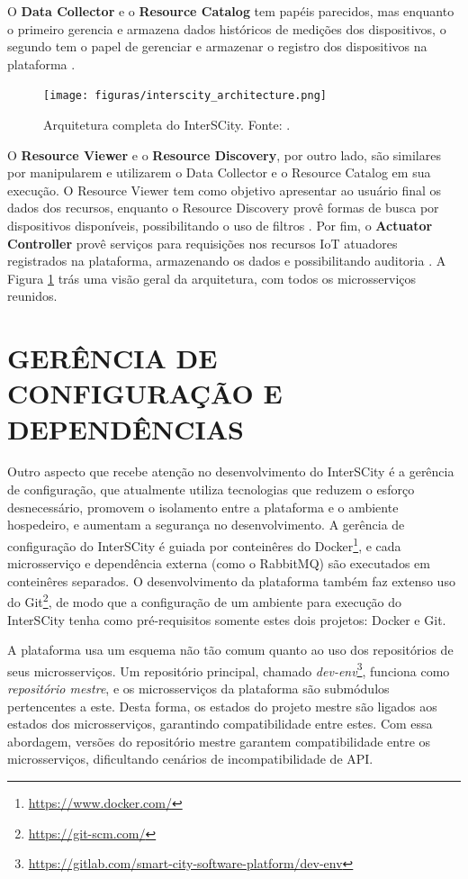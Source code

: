 O \textbf{Data Collector} e o \textbf{Resource Catalog} tem papéis parecidos,
mas enquanto o primeiro gerencia e armazena dados históricos de medições dos
dispositivos, o segundo tem o papel de gerenciar e armazenar o registro dos
dispositivos na plataforma \cite{delesposte2017}.

\begin{figure}
  \centering
    \texttt{[image: figuras/interscity\_architecture.png]}
    \caption{Arquitetura completa do InterSCity. Fonte: .}
  \label{fig:interscity-architecture}
\end{figure}


O \textbf{Resource Viewer} e o \textbf{Resource Discovery}, por outro lado,
são similares por manipularem e utilizarem o Data Collector e o Resource
Catalog em sua execução. O Resource Viewer tem como objetivo apresentar ao
usuário final os dados dos recursos, enquanto o Resource Discovery provê formas
de busca por dispositivos disponíveis, possibilitando o uso de filtros
\cite{delesposte2017}. Por fim, o \textbf{Actuator Controller} provê serviços
para requisições nos recursos IoT atuadores registrados na plataforma,
armazenando os dados e possibilitando auditoria \cite{delesposte2017}. A Figura
\ref{fig:interscity-architecture} trás uma visão geral da arquitetura, com todos
os microsserviços reunidos.

\section{GERÊNCIA DE CONFIGURAÇÃO E DEPENDÊNCIAS}

Outro aspecto que recebe atenção no desenvolvimento do InterSCity é a gerência
de configuração, que atualmente utiliza tecnologias que reduzem o esforço
desnecessário, promovem o isolamento entre a plataforma e o ambiente hospedeiro,
e aumentam a segurança no desenvolvimento. A gerência de configuração do
InterSCity é guiada por conteinêres do
Docker\footnote{\url{https://www.docker.com/}}, e cada microsserviço e
dependência externa (como o RabbitMQ) são executados em
conteinêres separados. O desenvolvimento da plataforma também faz extenso
uso do Git\footnote{\url{https://git-scm.com/}}, de modo que a
configuração de um ambiente para execução do InterSCity tenha como
pré-requisitos somente estes dois projetos: Docker e Git.

A plataforma usa um esquema não tão comum quanto ao uso dos repositórios de
seus microsserviços. Um repositório principal, chamado
\textit{dev-env}\footnote{\url{https://gitlab.com/smart-city-software-platform/dev-env}},
funciona como \textit{repositório mestre}, e os microsserviços da plataforma são
submódulos pertencentes a este. Desta forma, os estados do projeto mestre são
ligados aos estados dos microsserviços, garantindo compatibilidade entre estes.
Com essa abordagem, versões do repositório mestre garantem compatibilidade
entre os microsserviços, dificultando cenários de incompatibilidade de API.

